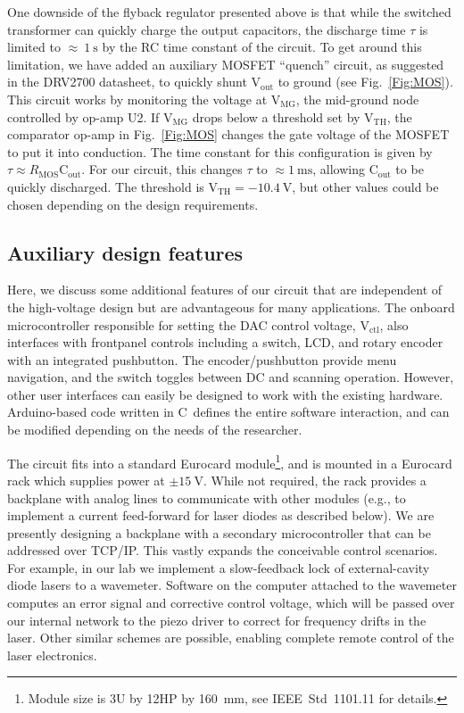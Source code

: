 \documentclass[aip,rsi,reprint]{revtex4-1} %
\newcommand{\CC}{{C\nolinebreak[4]\hspace{-.05em}\raisebox{.4ex}{\tiny\bf ++}}~}
\begin{document}
One downside of the flyback regulator presented above is that while the switched transformer can quickly charge the output capacitors, the discharge time $\tau$ is limited to {$\approx~\SI{1}{\second}$} by the RC time constant of the circuit.
To get around this limitation, we have added an auxiliary MOSFET ``quench'' circuit, as suggested in the DRV2700 datasheet\cite{DRV2700Datasheet}, to quickly shunt $\text{V}_\text{out}$ to ground (see Fig.~\ref{Fig:MOS}).
This circuit works by monitoring the voltage at $\text{V}_\text{MG}$, the mid-ground node controlled by op-amp U2.
If $\text{V}_\text{MG}$ drops below a threshold set by $\text{V}_\text{TH}$, the comparator op-amp in Fig.~\ref{Fig:MOS} changes the gate voltage of the MOSFET to put it into conduction.
The time constant for this configuration is given by $\tau \approx R_\text{MOS}\text{C}_\text{out}$.
For our circuit, this changes $\tau$ to $\approx\SI{1}{\milli\second}$, allowing $\text{C}_\text{out}$ to be quickly discharged.
The threshold is $\text{V}_\text{TH} = \SI{-10.4}{\volt}$, but other values could be chosen depending on the design requirements.



\subsection{Auxiliary design features}
\label{Sec:AuxDesign}

Here, we discuss some additional features of our circuit that are independent of the high-voltage design but are advantageous for many applications.
The onboard microcontroller responsible for setting the DAC control voltage, $\text{V}_\text{ctl}$, also interfaces with frontpanel controls including a switch, LCD, and rotary encoder with an integrated pushbutton.
The encoder/pushbutton provide menu navigation, and the switch toggles between DC and scanning operation.
However, other user interfaces can easily be designed to work with the existing hardware.
Arduino-based code\cite{Arduino} written in \CC defines the entire software interaction, and can be modified depending on the needs of the researcher.

The circuit fits into a standard Eurocard module\footnote{Module size is 3U by 12HP by \SI{160}{\milli\meter}, see IEEE~Std~1101.11 for details.}, and is mounted in a Eurocard rack which supplies power at $\pm\SI{15}{\volt}$.
While not required, the rack provides a backplane with analog lines to communicate with other modules (e.g., to implement a current feed-forward for laser diodes as described below).
We are presently designing a backplane with a secondary microcontroller that can be addressed over TCP/IP.
This vastly expands the conceivable control scenarios. 
For example, in our lab we implement a slow-feedback lock of external-cavity diode lasers to a wavemeter.
Software on the computer attached to the wavemeter computes an error signal and corrective control voltage, which will be passed over our internal network to the piezo driver to correct for frequency drifts in the laser.
Other similar schemes are possible, enabling complete remote control of the laser electronics.
\end{document}
